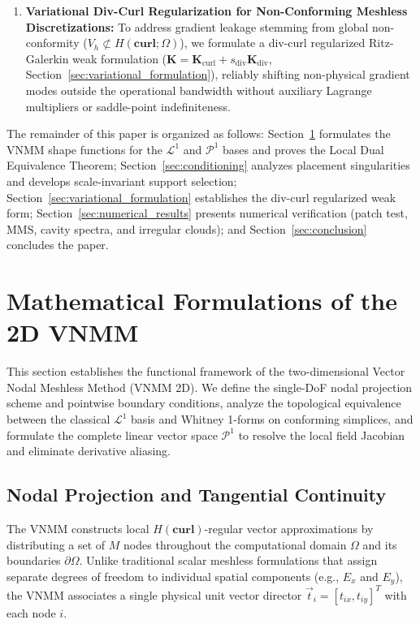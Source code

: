 \documentclass[preprint,12pt]{elsarticle}
\begin{document}
\begin{enumerate}
    \item \textbf{Variational Div-Curl Regularization for Non-Conforming Meshless Discretizations:}
          To address gradient leakage stemming from global non-conformity ($V_h \not\subset H(\mathbf{curl}; \Omega)$), we formulate a div-curl regularized Ritz-Galerkin weak formulation ($\mathbf{K} = \mathbf{K}_{\mathrm{curl}} + s_{\mathrm{div}} \mathbf{K}_{\mathrm{div}}$, Section~\ref{sec:variational_formulation}), reliably shifting non-physical gradient modes outside the operational bandwidth without auxiliary Lagrange multipliers or saddle-point indefiniteness.
\end{enumerate}

The remainder of this paper is organized as follows: Section~\ref{sec:formulations} formulates the VNMM shape functions for the $\mathcal{L}^1$ and $\mathcal{P}^1$ bases and proves the Local Dual Equivalence Theorem; Section~\ref{sec:conditioning} analyzes placement singularities and develops scale-invariant support selection; Section~\ref{sec:variational_formulation} establishes the div-curl regularized weak form; Section~\ref{sec:numerical_results} presents numerical verification (patch test, MMS, cavity spectra, and irregular clouds); and Section~\ref{sec:conclusion} concludes the paper.

\section{Mathematical Formulations of the 2D VNMM}
\label{sec:formulations}

This section establishes the functional framework of the two-dimensional Vector Nodal Meshless Method (VNMM 2D). We define the single-DoF nodal projection scheme and pointwise boundary conditions, analyze the topological equivalence between the classical $\mathcal{L}^1$ basis and Whitney 1-forms on conforming simplices, and formulate the complete linear vector space $\mathcal{P}^1$ to resolve the local field Jacobian and eliminate derivative aliasing.

\subsection{Nodal Projection and Tangential Continuity}
\label{subsec:nodal_projection}

The VNMM \cite{ortiz2021nodal, ortiz2023tese} constructs local $H(\mathbf{curl})$-regular vector approximations by distributing a set of $M$ nodes throughout the computational domain $\Omega$ and its boundaries $\partial\Omega$. Unlike traditional scalar meshless formulations that assign separate degrees of freedom to individual spatial components (e.g., $E_x$ and $E_y$), the VNMM associates a single physical unit vector director $\vec{t}_i = [t_{ix}, t_{iy}]^T$ with each node $i$.
\end{document}
